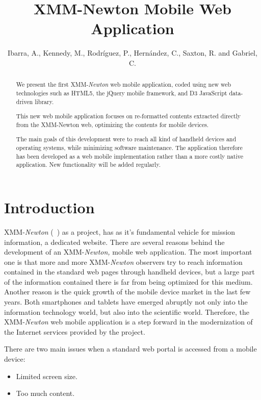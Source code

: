 
\resetcounters




\title{XMM-Newton Mobile Web Application}
\author{Ibarra, A., Kennedy, M., Rodr\'iguez, P., Hern\'andez, C., Saxton, R. and Gabriel, C.}

\begin{abstract}
We present the first XMM-{\em Newton} web mobile application, coded using new web technologies such as HTML5, the jQuery mobile framework, and D3 JavaScript data-driven library.

This new web mobile application focuses on re-formatted contents extracted directly from the XMM-Newton web, optimizing the contents for mobile devices. 

The main goals of this development were to reach all kind of handheld devices and operating systems, while minimizing software maintenance. The application therefore has been developed as a web mobile implementation rather than a more costly native application. New functionality will be added regularly.

\end{abstract}

\section{Introduction}

XMM-{\em Newton} (~\cite{Jansen}) as a project, has as it's fundamental vehicle for mission information, a dedicated website. There are several reasons behind the development of an XMM-{\em Newton,} mobile web application. The most important one is that more and more XMM-{\em Newton} observers try to reach information contained in the standard web pages through handheld devices, but a large part of the information contained there is far from being optimized for this medium. Another reason is the quick growth of the mobile device market in the last few years.  Both smartphones and tablets have emerged abruptly not only into the information technology world, but also into the scientific world. Therefore, the XMM-{\em Newton} web mobile application is a step forward in the modernization of the Internet services provided by the project.
 
There are two main issues when a standard web portal is accessed from a mobile device:
\begin{itemize}
\item Limited screen size.
\item Too much content.
\end{itemize}

